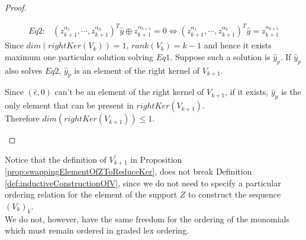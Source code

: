 \documentclass[11pt]{llncs}
\begin{document}
\begin{proof}
\begin{itemize}
\begin{itemize}
\begin{itemize}
\begin{align*}
                        Eq2: & (z_{k+1}^{\alpha_1}, \cdots, z_{k+1}^{\alpha_k})^T \hat{y} \oplus z_{k+1}^{\alpha_{k+1}} = 0 \iff (z_{k+1}^{\alpha_1}, \cdots, z_{k+1}^{\alpha_k})^T \hat{y} = z_{k+1}^{\alpha_{k+1}} 
                \end{align*}
                Since $dim(rightKer(V_k)) = 1$, $rank(V_k) = k-1$ and hence it exists maximum one particular solution solving $Eq1$. Suppose such a solution is $\hat{y}_p$. If $\hat{y}_p$ also solves $Eq2$, $\hat{y}_p$ is an element of the right kernel of $V_{k+1}$.
            \end{itemize}
            Since $(\hat{\epsilon}, 0)$ can't be an element of the right kernel of $V_{k+1}$, if it exists, $\hat{y}_p$ is the only element that can be present in $rightKer(V_{k+1})$.\\
            Therefore $dim\left(rightKer(V_{k+1})\right) \leq 1$.
        \end{itemize}
    \end{itemize} 
\end{proof}

\begin{remark}
    Notice that the definition of $V^{'}_{k+1}$ in Proposition \ref{prop:swappingElementOfZToReduceKer}, does not break Definition \ref{def:inductiveConstructionOfV}, since we do not need to specify a particular ordering relation for the element of the support $Z$ to construct the sequence $(V_{k})_k$.\\
    We do not, however, have the same freedom for the ordering of the monomials which must remain ordered in graded lex ordering.
\end{remark}
\end{document}

